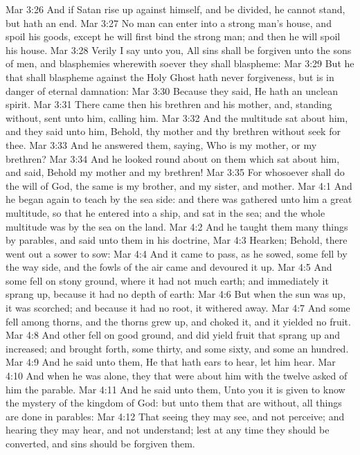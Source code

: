 \vs Mar 3:26 And if Satan rise up against himself, and be divided, he cannot stand, but hath an end.
\vs Mar 3:27 No man can enter into a strong man's house, and spoil his goods, except he will first bind the strong man; and then he will spoil his house.
\vs Mar 3:28 Verily I say unto you, All sins shall be forgiven unto the sons of men, and blasphemies wherewith soever they shall blaspheme:
\vs Mar 3:29 But he that shall blaspheme against the Holy Ghost hath never forgiveness, but is in danger of eternal damnation:
\vs Mar 3:30 Because they said, He hath an unclean spirit.
\vs Mar 3:31 There came then his brethren and his mother, and, standing without, sent unto him, calling him.
\vs Mar 3:32 And the multitude sat about him, and they said unto him, Behold, thy mother and thy brethren without seek for thee.
\vs Mar 3:33 And he answered them, saying, Who is my mother, or my brethren?
\vs Mar 3:34 And he looked round about on them which sat about him, and said, Behold my mother and my brethren!
\vs Mar 3:35 For whosoever shall do the will of God, the same is my brother, and my sister, and mother.
\vs Mar 4:1 And he began again to teach by the sea side: and there was gathered unto him a great multitude, so that he entered into a ship, and sat in the sea; and the whole multitude was by the sea on the land.
\vs Mar 4:2 And he taught them many things by parables, and said unto them in his doctrine,
\vs Mar 4:3 Hearken; Behold, there went out a sower to sow:
\vs Mar 4:4 And it came to pass, as he sowed, some fell by the way side, and the fowls of the air came and devoured it up.
\vs Mar 4:5 And some fell on stony ground, where it had not much earth; and immediately it sprang up, because it had no depth of earth:
\vs Mar 4:6 But when the sun was up, it was scorched; and because it had no root, it withered away.
\vs Mar 4:7 And some fell among thorns, and the thorns grew up, and choked it, and it yielded no fruit.
\vs Mar 4:8 And other fell on good ground, and did yield fruit that sprang up and increased; and brought forth, some thirty, and some sixty, and some an hundred.
\vs Mar 4:9 And he said unto them, He that hath ears to hear, let him hear.
\vs Mar 4:10 And when he was alone, they that were about him with the twelve asked of him the parable.
\vs Mar 4:11 And he said unto them, Unto you it is given to know the mystery of the kingdom of God: but unto them that are without, all  things are done in parables:
\vs Mar 4:12 That seeing they may see, and not perceive; and hearing they may hear, and not understand; lest at any time they should be converted, and  sins should be forgiven them.
